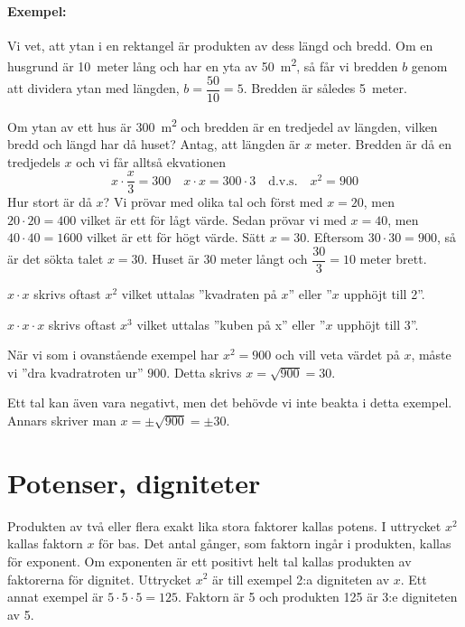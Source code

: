 \paragraph{Exempel:}
Vi vet, att ytan i en rektangel är produkten av dess längd och bredd.
Om en husgrund är 10~meter lång och har en yta av \SI{50}{\square\metre}, så får
vi bredden \(b\) genom att dividera ytan med längden, \(b = \dfrac{50}{10} = 5\).
Bredden är således 5~meter.

Om ytan av ett hus är \SI{300}{\square\metre} och bredden är en tredjedel av
längden, vilken bredd och längd har då huset?
Antag, att längden är \(x\) meter.
Bredden är då en tredjedels \(x\) och vi får alltså ekvationen
%
\[
x \cdot \frac{x}{3} = 300 \quad
x \cdot x = 300 \cdot 3 \quad \text{d.v.s.}
\quad x^2 = 900
\]
%
Hur stort är då \(x\)?
Vi prövar med olika tal och först med \(x = 20\), men \(20 \cdot 20 = 400\)
vilket är ett för lågt värde.
Sedan prövar vi med \(x = 40\), men \(40 \cdot 40 = 1600\) vilket är ett för
högt värde.
Sätt \(x = 30\). Eftersom \(30 \cdot 30 = 900\), så är det sökta talet
\(x = 30\).
Huset är 30 meter långt och \(\dfrac{30}{3} = 10\) meter brett.

\(x \cdot x\) skrivs oftast \(x^2\) vilket uttalas ''kvadraten på \(x\)''
eller ''\(x\) upphöjt till 2''.

\(x \cdot x \cdot x\) skrivs oftast \(x^3\) vilket uttalas ''kuben på x''
eller ''\(x\) upphöjt till 3''.

När vi som i ovanstående exempel har \(x^2 = 900\) och vill veta värdet på
\(x\), måste vi ''dra kvadratroten ur'' \(900\).
Detta skrivs \(x = \sqrt{900} = 30\).

Ett tal kan även vara negativt, men det behövde vi inte beakta i detta exempel.
Annars skriver man \(x = \pm \sqrt{900} = \pm 30\).

\section{Potenser, digniteter}
\label{potenser}

Produkten av två eller flera exakt lika stora faktorer kallas potens.
I uttrycket \(x^2\) kallas faktorn \(x\) för bas. Det antal gånger, som faktorn
ingår i produkten, kallas för exponent.
Om exponenten är ett positivt helt tal kallas produkten av faktorerna för
dignitet.
Uttrycket \(x^2\) är till exempel 2:a digniteten av \(x\).
Ett annat exempel är \(5 \cdot 5 \cdot 5 = 125\).
Faktorn är 5 och produkten 125 är 3:e digniteten av 5.

